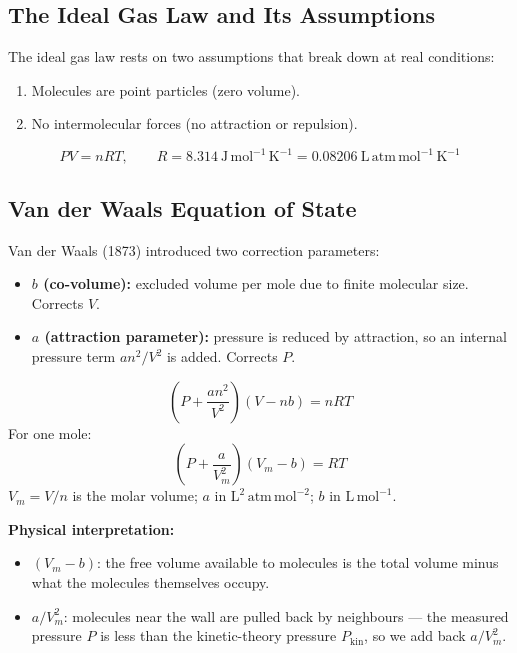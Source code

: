\documentclass[12pt,a4paper]{article}
\begin{document}
\subsection{The Ideal Gas Law and Its Assumptions}
The ideal gas law rests on two assumptions that break down at real conditions:
\begin{enumerate}[leftmargin=*, itemsep=2pt, topsep=2pt]
  \item Molecules are point particles (zero volume).
  \item No intermolecular forces (no attraction or repulsion).
\end{enumerate}

\begin{tcolorbox}[formulabox, title={Ideal Gas Law}]
\[
PV = nRT, \qquad R = 8.314\ \mathrm{J\,mol^{-1}\,K^{-1}} = 0.08206\ \mathrm{L\,atm\,mol^{-1}\,K^{-1}}
\]
\end{tcolorbox}

\subsection{Van der Waals Equation of State}
Van der Waals (1873) introduced two correction parameters:
\begin{itemize}[leftmargin=*, itemsep=2pt, topsep=2pt]
  \item \textbf{$b$ (co-volume):} excluded volume per mole due to finite molecular size. Corrects $V$.
  \item \textbf{$a$ (attraction parameter):} pressure is reduced by attraction, so an internal pressure term $a n^2/V^2$ is added. Corrects $P$.
\end{itemize}

\begin{tcolorbox}[formulabox, title={Van der Waals Equation}]
\[
\boxed{\left(P + \frac{an^2}{V^2}\right)(V - nb) = nRT}
\]
For one mole:
\[
\left(P + \frac{a}{V_m^2}\right)(V_m - b) = RT
\]
$V_m = V/n$ is the molar volume; $a$ in $\mathrm{L^2\,atm\,mol^{-2}}$; $b$ in $\mathrm{L\,mol^{-1}}$.
\end{tcolorbox}

\textbf{Physical interpretation:}
\begin{itemize}[leftmargin=*, itemsep=1pt, topsep=2pt]
  \item $(V_m - b)$: the free volume available to molecules is the total volume minus what the molecules themselves occupy.
  \item $a/V_m^2$: molecules near the wall are pulled back by neighbours --- the measured pressure $P$ is less than the kinetic-theory pressure $P_{\mathrm{kin}}$, so we add back $a/V_m^2$.
\end{itemize}
\end{document}
